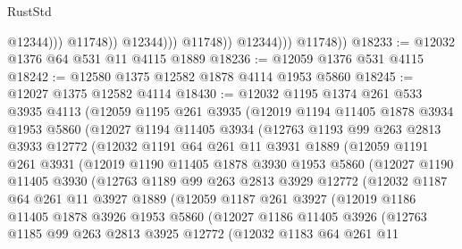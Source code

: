 \begin{lexlean}{RustStd}
\begin{coremodule}
                                  @12344)))
                            @11748))
                        @12344)))
                  @11748))
              @12344)))
        @11748))
@18233 := @12032 @1376 @64 @531 @11 @4115 @1889
@18236 := @12059 @1376 @531 @4115
@18242 := @12580 @1375 @12582 @1878 @4114 @1953 @5860
@18245 := @12027 @1375 @12582 @4114
@18430 := @12032
    @1195
    @1374
    @261
    @533
    @3935
    @4113
    (@12059
      @1195
      @261
      @3935
      (@12019
        @1194
        @11405
        @1878
        @3934
        @1953
        @5860
        (@12027
          @1194
          @11405
          @3934
          (@12763
            @1193
            @99
            @263
            @2813
            @3933
            @12772
            (@12032
              @1191
              @64
              @261
              @11
              @3931
              @1889
              (@12059
                @1191
                @261
                @3931
                (@12019
                  @1190
                  @11405
                  @1878
                  @3930
                  @1953
                  @5860
                  (@12027
                    @1190
                    @11405
                    @3930
                    (@12763
                      @1189
                      @99
                      @263
                      @2813
                      @3929
                      @12772
                      (@12032
                        @1187
                        @64
                        @261
                        @11
                        @3927
                        @1889
                        (@12059
                          @1187
                          @261
                          @3927
                          (@12019
                            @1186
                            @11405
                            @1878
                            @3926
                            @1953
                            @5860
                            (@12027
                              @1186
                              @11405
                              @3926
                              (@12763
                                @1185
                                @99
                                @263
                                @2813
                                @3925
                                @12772
                                (@12032
                                  @1183
                                  @64
                                  @261
                                  @11

\end{coremodule}
\end{lexlean}
